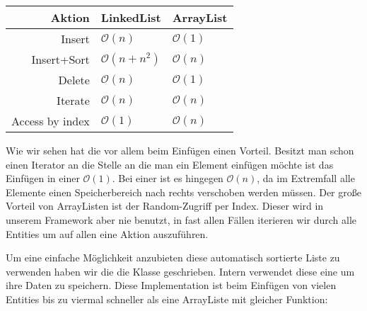 \begin{table}[h]
\begin{tabular}{|r|l|l|}
\hline
Aktion          & LinkedList             & ArrayList        \\ \hline
Insert          & $ \mathcal O(n)       $ & $ \mathcal O(1) $ \\ \hline
Insert+Sort     & $ \mathcal O(n + n^2) $ & $ \mathcal O(n) $ \\ \hline
Delete          & $ \mathcal O(n)       $ & $ \mathcal O(1) $ \\ \hline
Iterate         & $ \mathcal O(n)       $ & $ \mathcal O(n) $ \\ \hline
Access by index & $ \mathcal O(1)       $ & $ \mathcal O(n) $ \\ \hline
\end{tabular}
\end{table} %

Wie wir sehen hat die  vor allem beim Einfügen  einen Vorteil. Besitzt man schon einen Iterator an die Stelle an die man ein Element einfügen möchte ist das Einfügen in einer  $\mathcal O(1)$. Bei einer  ist es hingegen $\mathcal O(n)$, da im Extremfall alle Elemente einen Speicherbereich nach rechts verschoben werden müssen.
Der große Vorteil von ArrayListen ist der Random-Zugriff per Index. Dieser wird in unserem Framework aber nie benutzt, in fast allen Fällen iterieren wir durch alle Entities um auf allen eine Aktion auszuführen.

Um eine einfache Möglichkeit anzubieten diese automatisch sortierte Liste zu verwenden haben wir die die Klasse  geschrieben. Intern verwendet diese eine  um ihre Daten zu speichern. Diese Implementation ist beim Einfügen von vielen Entities bis zu viermal schneller als eine ArrayListe mit gleicher Funktion:

